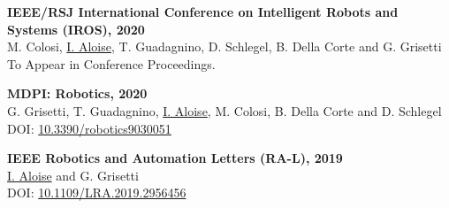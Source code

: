 \documentclass[a4paper,12pt]{memoir} %
\begin{document}

       {\textbf{\small IEEE/RSJ International Conference on Intelligent Robots and Systems (IROS), 2020} 
  \\
  M. Colosi, \underline{I. Aloise}, T. Guadagnino, D. Schlegel, B. Della Corte and G. Grisetti \\ 
  To Appear in Conference Proceedings.
}

       {\textbf{\small MDPI: Robotics, 2020} 
  \\
  G. Grisetti, T. Guadagnino, \underline{I. Aloise}, M. Colosi, B. Della Corte and D. Schlegel \\ 
  DOI: \href{https://doi.org/10.3390/robotics9030051}{10.3390/robotics9030051} 
}

       {\textbf{\small IEEE Robotics and Automation Letters (RA-L), 2019} 
  \\
  \underline{I. Aloise} and G. Grisetti \\ 
  DOI: \href{https://doi.org/10.1109/LRA.2019.2956456}{10.1109/LRA.2019.2956456} 
}


\Sep %
\Sep %

\clearpage %
\userinformation %
\framebreak %


\end{document}
